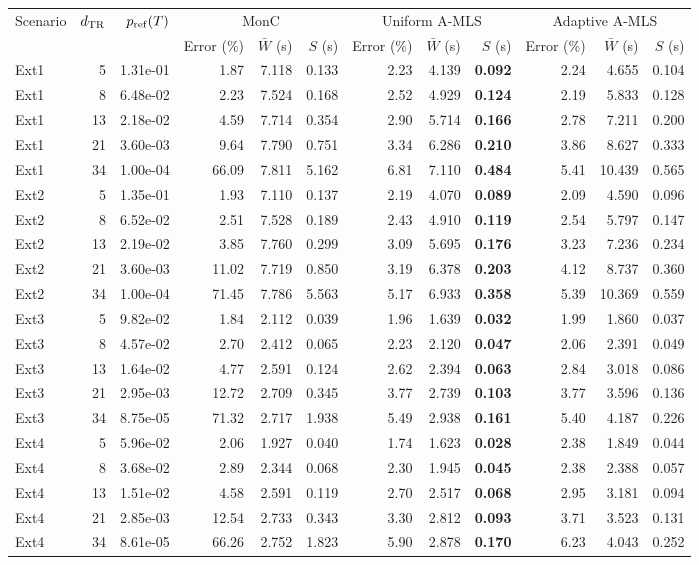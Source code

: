 \begin{tabular}{lrr|rrr|rrr|rrr}
\hline
Scenario & $d_{\rm TR}$ & $p_{\rm ref}(T)$ & \multicolumn{3}{c|}{MonC} & \multicolumn{3}{c|}{Uniform A-MLS} & \multicolumn{3}{c}{Adaptive A-MLS} \\
 & & & Error (\%) & $\bar W$ (s) & $S$ (s) & Error (\%) & $\bar W$ (s) & $S$ (s) & Error (\%) & $\bar W$ (s) & $S$ (s) \\
\hline
Ext1 & 5 & 1.31e-01 & 1.87 & 7.118 & 0.133 & 2.23 & 4.139 & \textbf{0.092} & 2.24 & 4.655 & 0.104 \\
Ext1 & 8 & 6.48e-02 & 2.23 & 7.524 & 0.168 & 2.52 & 4.929 & \textbf{0.124} & 2.19 & 5.833 & 0.128 \\
Ext1 & 13 & 2.18e-02 & 4.59 & 7.714 & 0.354 & 2.90 & 5.714 & \textbf{0.166} & 2.78 & 7.211 & 0.200 \\
Ext1 & 21 & 3.60e-03 & 9.64 & 7.790 & 0.751 & 3.34 & 6.286 & \textbf{0.210} & 3.86 & 8.627 & 0.333 \\
Ext1 & 34 & 1.00e-04 & 66.09 & 7.811 & 5.162 & 6.81 & 7.110 & \textbf{0.484} & 5.41 & 10.439 & 0.565 \\
\hline
Ext2 & 5 & 1.35e-01 & 1.93 & 7.110 & 0.137 & 2.19 & 4.070 & \textbf{0.089} & 2.09 & 4.590 & 0.096 \\
Ext2 & 8 & 6.52e-02 & 2.51 & 7.528 & 0.189 & 2.43 & 4.910 & \textbf{0.119} & 2.54 & 5.797 & 0.147 \\
Ext2 & 13 & 2.19e-02 & 3.85 & 7.760 & 0.299 & 3.09 & 5.695 & \textbf{0.176} & 3.23 & 7.236 & 0.234 \\
Ext2 & 21 & 3.60e-03 & 11.02 & 7.719 & 0.850 & 3.19 & 6.378 & \textbf{0.203} & 4.12 & 8.737 & 0.360 \\
Ext2 & 34 & 1.00e-04 & 71.45 & 7.786 & 5.563 & 5.17 & 6.933 & \textbf{0.358} & 5.39 & 10.369 & 0.559 \\
\hline
Ext3 & 5 & 9.82e-02 & 1.84 & 2.112 & 0.039 & 1.96 & 1.639 & \textbf{0.032} & 1.99 & 1.860 & 0.037 \\
Ext3 & 8 & 4.57e-02 & 2.70 & 2.412 & 0.065 & 2.23 & 2.120 & \textbf{0.047} & 2.06 & 2.391 & 0.049 \\
Ext3 & 13 & 1.64e-02 & 4.77 & 2.591 & 0.124 & 2.62 & 2.394 & \textbf{0.063} & 2.84 & 3.018 & 0.086 \\
Ext3 & 21 & 2.95e-03 & 12.72 & 2.709 & 0.345 & 3.77 & 2.739 & \textbf{0.103} & 3.77 & 3.596 & 0.136 \\
Ext3 & 34 & 8.75e-05 & 71.32 & 2.717 & 1.938 & 5.49 & 2.938 & \textbf{0.161} & 5.40 & 4.187 & 0.226 \\
\hline
Ext4 & 5 & 5.96e-02 & 2.06 & 1.927 & 0.040 & 1.74 & 1.623 & \textbf{0.028} & 2.38 & 1.849 & 0.044 \\
Ext4 & 8 & 3.68e-02 & 2.89 & 2.344 & 0.068 & 2.30 & 1.945 & \textbf{0.045} & 2.38 & 2.388 & 0.057 \\
Ext4 & 13 & 1.51e-02 & 4.58 & 2.591 & 0.119 & 2.70 & 2.517 & \textbf{0.068} & 2.95 & 3.181 & 0.094 \\
Ext4 & 21 & 2.85e-03 & 12.54 & 2.733 & 0.343 & 3.30 & 2.812 & \textbf{0.093} & 3.71 & 3.523 & 0.131 \\
Ext4 & 34 & 8.61e-05 & 66.26 & 2.752 & 1.823 & 5.90 & 2.878 & \textbf{0.170} & 6.23 & 4.043 & 0.252 \\
\hline
\end{tabular}
